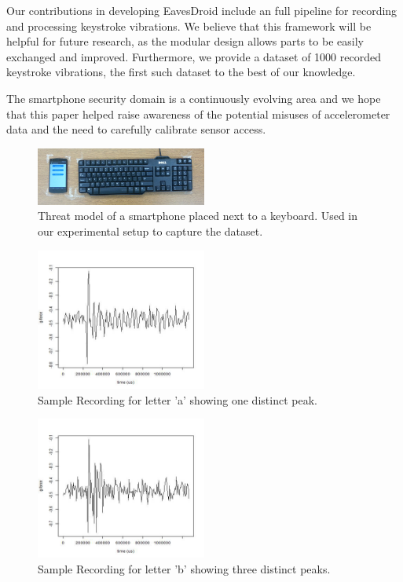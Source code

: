 \documentclass[11pt,conference]{IEEEtran}
\begin{document}
Our contributions in developing EavesDroid include an full pipeline for recording and processing keystroke vibrations. We believe that this framework will be helpful for future research, as the modular design allows parts to be easily exchanged and improved.
Furthermore, we provide a dataset of 1000 recorded keystroke vibrations, the first such dataset to the best of our knowledge.

The smartphone security domain is a continuously evolving area and we hope that this paper helped raise awareness of the potential misuses of accelerometer data and the need to carefully calibrate sensor access.


\pagebreak

\begin{figure}
\centering
\includegraphics[width=0.5\textwidth]{img/setup}
\caption{Threat model of a smartphone placed next to a keyboard. Used in our experimental setup to capture the dataset.
}
\label{fig:setup}
\end{figure}

\begin{figure}
\centering
\includegraphics[width=0.5\textwidth]{img/a_162}
\caption{Sample Recording for letter 'a' showing one distinct peak.}
\label{fig:signal-a}
\end{figure}

\begin{figure}
\centering
\includegraphics[width=0.5\textwidth]{img/b_147}
\caption{Sample Recording for letter 'b' showing three distinct peaks.}
\label{fig:signal-b}
\end{figure}
\end{document}
